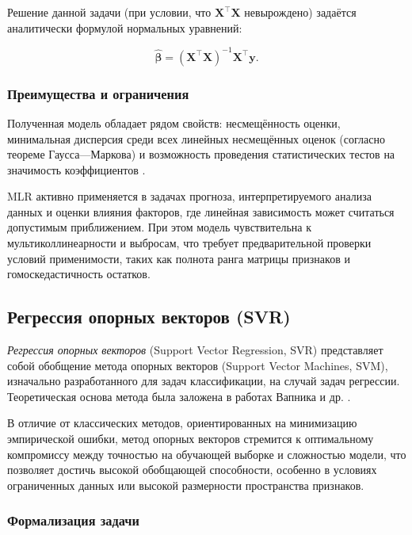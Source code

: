 Решение данной задачи (при условии, что $\mathbf{X}^\top \mathbf{X}$ невырождено) задаётся аналитически формулой нормальных уравнений:

\begin{equation}
\hat{\boldsymbol{\beta}} = (\mathbf{X}^\top \mathbf{X})^{-1} \mathbf{X}^\top \mathbf{y}.
\end{equation}

\subsubsection{Преимущества и ограничения}

Полученная модель обладает рядом свойств: несмещённость оценки, минимальная дисперсия среди всех линейных несмещённых оценок (согласно теореме Гаусса—Маркова) и возможность проведения статистических тестов на значимость коэффициентов \cite{fisher1922, rao1973}.

MLR активно применяется в задачах прогноза, интерпретируемого анализа данных и оценки влияния факторов, где линейная зависимость может считаться допустимым приближением. При этом модель чувствительна к мультиколлинеарности и выбросам, что требует предварительной проверки условий применимости, таких как полнота ранга матрицы признаков и гомоскедастичность остатков.

\subsection{Регрессия опорных векторов (SVR)}

\textit{Регрессия опорных векторов} (Support Vector Regression, SVR) представляет собой обобщение метода опорных векторов (Support Vector Machines, SVM), изначально разработанного для задач классификации, на случай задач регрессии. Теоретическая основа метода была заложена в работах Вапника и др. \cite{vapnik1995, vapnik1997svr}.

В отличие от классических методов, ориентированных на минимизацию эмпирической ошибки, метод опорных векторов стремится к оптимальному компромиссу между точностью на обучающей выборке и сложностью модели, что позволяет достичь высокой обобщающей способности, особенно в условиях ограниченных данных или высокой размерности  пространства признаков.

\subsubsection{Формализация задачи}

